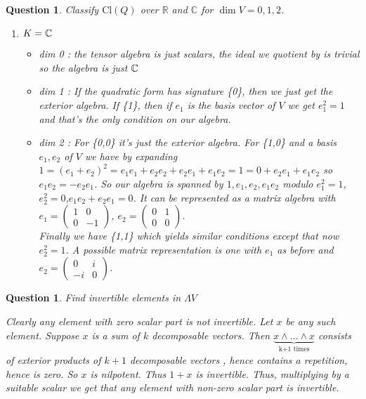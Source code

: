 \documentclass[a4paper]{article}
\newtheorem{que}[thm]{Question}
\begin{document}
\begin{que} Classify $ \text{Cl}(Q)$ over $\mathbb{R}$ and $\mathbb{C}$ for $\dim V = 0, 1, 2$.\\
 \begin{enumerate}
     \item $K=\mathbb{C}$
         \begin{itemize}
             \item dim 0 : the tensor algebra is just scalars, the ideal we quotient by is trivial so the algebra is just $\mathbb{C}$
             \item dim 1 : If the quadratic form  has signature \{0\}, then we just get the exterior algebra. If \{1\}, then if $e_1$ is the basis vector of $V$ we get $e_1^2=1$ and that's the only condition on our algebra.
             \item dim 2 : For \{0,0\} it's just the exterior algebra. For \{1,0\} and a basis $e_1,e_2$ of $V$ we have by expanding  $1=\left( e_1+e_2 \right)^2=e_1e_1+e_2e_2+e_2e_1+e_1e_2=1=0+e_2e_1+e_1e_2 $ so $e_1e_2=-e_2e_1$. So our algebra is spanned by $1,e_1,e_2,e_1e_2$ modulo $e_1^2=1$,$e_2^2=0$,$e_1e_2+e_2e_1=0$. It can be represented as a matrix algebra with $e_1=\begin{pmatrix} 1 & 0\\0 & -1 \end{pmatrix} $, $e_2=\begin{pmatrix} 0 & 1\\0 & 0 \end{pmatrix} $.\\
                 Finally we have \{1,1\} which yields similar conditions except that now $e_2^2=1$. A possible matrix representation is one with $e_1$ as before and $e_2=\begin{pmatrix} 0 & i\\-i & 0  \end{pmatrix} $.
         \end{itemize}
 \end{enumerate}

\end{que}
\begin{que} Find invertible elements in $\Lambda V$
	
	Clearly any element with zero scalar part is not invertible. Let $x$ be any such element. Suppose $x$ is a sum of $k$ decomposable vectors. Then $\underbrace{x \wedge ... \wedge x}_\text{k+1 times}$ consists of exterior products of $k+1$ decomposable vectors , hence contains a repetition, hence is zero. So $x$ is nilpotent. Thus $1+x$ is invertible. Thus, multiplying by a suitable scalar we get that any element with non-zero scalar part is invertible.
	
\end{que}
\end{document}
